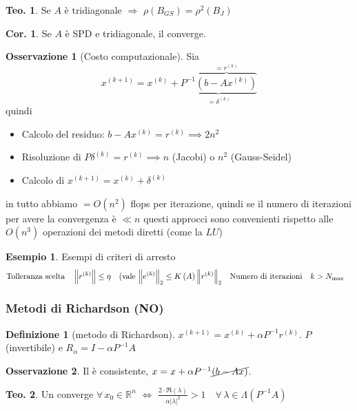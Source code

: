 \documentclass[a4paper,10pt]{article}
\theoremstyle{definition}
\theoremstyle{indentdefinition}
\newtheorem{defn}{Definizione}[section]
\theoremstyle{indenttheorem}
\newtheorem{thm}{Teo.}
\newtheorem{cor}{Cor.}
\theoremstyle{myremark}
\newtheorem*{rem*}{Osservazione}
\newtheorem{example*}{Esempio}
\theoremstyle{indentgeneral}
\theoremstyle{plain}
\theoremstyle{plain}
\begin{document}
\begin{thm}
Se $A$ è tridiagonale $\Longrightarrow$ $\rho\left(B_{GS}\right)=\rho^{2}\left(B_{J}\right)$
\end{thm}

\begin{cor}
Se $A$ è SPD e tridiagonale, il  converge.
\end{cor}

\begin{rem*}[Costo computazionale]Sia $$x^{(k+1)}=x^{\left(k\right)}+\underbrace{P^{-1}\overbrace{\left(b-Ax^{\left(k\right)}\right)}^{=r^{(k)}}}_{=\delta^{(k)}}$$
quindi
\begin{itemize}
    \item Calcolo del residuo: $b-Ax^{\left(k\right)}=r^{(k)} \implies 2n^2$
    \item Risoluzione di $P\delta^{(k)}=r^{(k)}\implies n$ (Jacobi) o $n^2$ (Gauss-Seidel)
    \item Calcolo di $x^{(k+1)}=x^{(k)}+\delta^{(k)}$
\end{itemize}
in tutto abbiamo $=O(n^2)$ flops per iterazione, quindi se il numero di iterazioni per avere la convergenza è $\ll n$ questi approcci sono convenienti rispetto alle $O(n^3)$ operazioni dei metodi diretti (come la $LU$)

\end{rem*}

\begin{example*}
Esempi di criteri di arresto
\begin{align*}
\text{Tolleranza scelta}\quad & \left\Vert r^{\left(k\right)}\right\Vert \leq\eta\quad\text{(vale \ensuremath{\left\Vert e^{\left(k\right)}\right\Vert _{2}\leq K\left(A\right)\left\Vert r^{\left(k\right)}\right\Vert _{2}}} & \text{Numero di iterazioni}\quad & k>N_{\max}
\end{align*}
\end{example*}

\subsubsection{Metodi di Richardson (NO)}
\begin{defn}[metodo di Richardson]
\label{def:metodo-di-richardson}$x^{\left(k+1\right)}=x^{\left(k\right)}+\alpha P^{-1}r^{\left(k\right)}$.
$P$ (invertibile) e $R_{\alpha}=I-\alpha P^{-1}A$
\end{defn}

\begin{rem*}
Il  è consistente, $x=x+\alpha P^{-1}\cancel{\left(b-Ax\right)}$.
\end{rem*}
\begin{thm}
Un  converge $\forall\,x_{0}\in\mathbb{R}^{n}$
$\Longleftrightarrow$ $\frac{2\cdot\Re\left(\lambda\right)}{\alpha\left|\lambda\right|^{2}}>1\quad\forall\,\lambda\in\Lambda\left(P^{-1}A\right)$
\end{thm}
\end{document}

